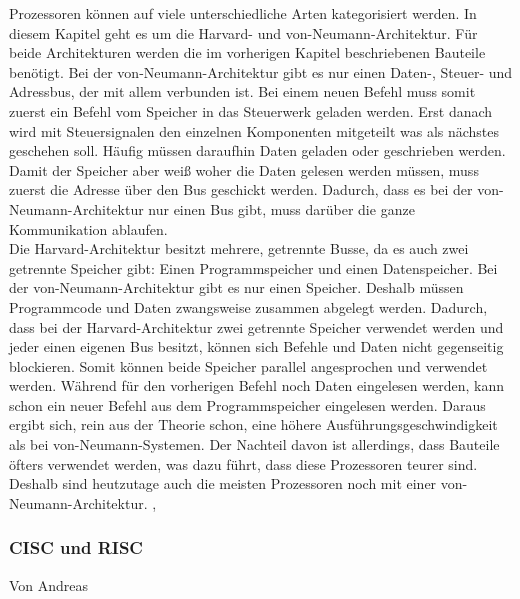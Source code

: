 \documentclass[12pt]{article}
\begin{document}
\noindent
Prozessoren können auf viele unterschiedliche Arten kategorisiert werden. In diesem Kapitel geht es um die Harvard- und von-Neumann-Architektur. 
Für beide Architekturen werden die im vorherigen Kapitel beschriebenen Bauteile benötigt. 
Bei der von-Neumann-Architektur gibt es nur einen Daten-, Steuer- und Adressbus, der mit allem verbunden ist. 
Bei einem neuen Befehl muss somit zuerst ein Befehl vom Speicher in das Steuerwerk geladen werden. 
Erst danach wird mit Steuersignalen den einzelnen Komponenten mitgeteilt was als nächstes geschehen soll. Häufig müssen daraufhin Daten geladen oder geschrieben werden. 
Damit der Speicher aber weiß woher die Daten gelesen werden müssen, muss zuerst die Adresse über den Bus geschickt werden. 
Dadurch, dass es bei der von-Neumann-Architektur nur einen Bus gibt, muss darüber die ganze Kommunikation ablaufen.
\\
Die Harvard-Architektur besitzt mehrere, getrennte Busse, da es auch zwei getrennte Speicher gibt: 
Einen Programmspeicher und einen Datenspeicher. 
Bei der von-Neumann-Architektur gibt es nur einen Speicher.
Deshalb müssen Programmcode und Daten zwangsweise zusammen abgelegt werden. 
Dadurch, dass bei der Harvard-Architektur zwei getrennte Speicher verwendet werden und jeder einen eigenen Bus besitzt, können sich Befehle und Daten nicht gegenseitig blockieren. 
Somit können beide Speicher parallel angesprochen und verwendet werden. 
Während für den vorherigen Befehl noch Daten eingelesen werden, kann schon ein neuer Befehl aus dem Programmspeicher eingelesen werden. 
Daraus ergibt sich, rein aus der Theorie schon, eine höhere Ausführungsgeschwindigkeit als bei von-Neumann-Systemen. 
Der Nachteil davon ist allerdings, dass Bauteile öfters verwendet werden, was dazu führt, dass diese Prozessoren teurer sind.
Deshalb sind heutzutage auch die meisten Prozessoren noch mit einer von-Neumann-Architektur. \cite{Architektur_stud}, \cite{Architektur}

\subsubsection{CISC und RISC}
Von Andreas\\
\end{document}
